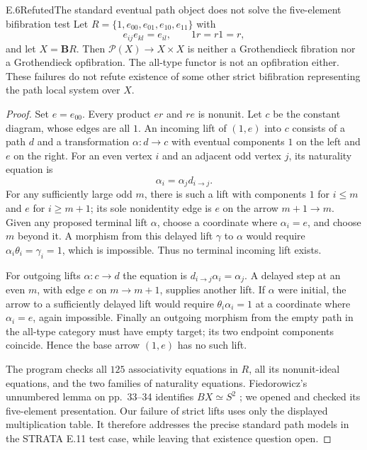 \begin{result}{E.6}{Refuted}{The standard eventual path object does not solve the five-element bifibration test}
Let $R=\{1,e_{00},e_{01},e_{10},e_{11}\}$ with
\[
 e_{ij}e_{kl}=e_{il},\qquad 1r=r1=r,
\]
and let $X=\mathbf B R$. Then $\mathcal P(X)\to X\times X$ is neither a Grothendieck fibration nor a Grothendieck opfibration. The all-type functor is not an opfibration either. These failures do not refute existence of some other strict bifibration representing the path local system over $X$.
\end{result}
\begin{proof}
Set $e=e_{00}$. Every product $er$ and $re$ is nonunit. Let $c$ be the constant diagram, whose edges are all $1$. An incoming lift of $(1,e)$ into $c$ consists of a path $d$ and a transformation $\alpha:d\to c$ with eventual components $1$ on the left and $e$ on the right. For an even vertex $i$ and an adjacent odd vertex $j$, its naturality equation is
\[
 \alpha_i=\alpha_jd_{i\to j}.
\]
For any sufficiently large odd $m$, there is such a lift with components $1$ for $i\leq m$ and $e$ for $i\geq m+1$; its sole nonidentity edge is $e$ on the arrow $m+1\to m$. Given any proposed terminal lift $\alpha$, choose a coordinate where $\alpha_i=e$, and choose $m$ beyond it. A morphism from this delayed lift $\gamma$ to $\alpha$ would require $\alpha_i\theta_i=\gamma_i=1$, which is impossible. Thus no terminal incoming lift exists.

For outgoing lifts $\alpha:c\to d$ the equation is $d_{i\to j}\alpha_i=\alpha_j$. A delayed step at an even $m$, with edge $e$ on $m\to m+1$, supplies another lift. If $\alpha$ were initial, the arrow to a sufficiently delayed lift would require $\theta_i\alpha_i=1$ at a coordinate where $\alpha_i=e$, again impossible. Finally an outgoing morphism from the empty path in the all-type category must have empty target; its two endpoint components coincide. Hence the base arrow $(1,e)$ has no such lift.

The program checks all $125$ associativity equations in $R$, all its nonunit-ideal equations, and the two families of naturality equations. Fiedorowicz's unnumbered lemma on pp.~33--34 identifies $BX\simeq S^2$ \citep{Fiedorowicz2002}; we opened and checked its five-element presentation. Our failure of strict lifts uses only the displayed multiplication table. It therefore addresses the precise standard path models in the STRATA E.11 test case, while leaving that existence question open.
\end{proof}


